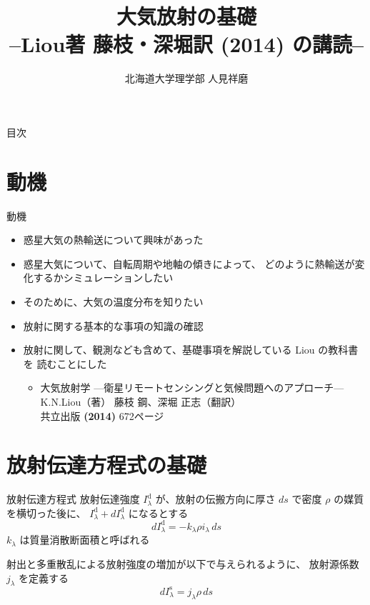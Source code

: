\documentclass[unicode,colorlinks]{beamer}
\title{大気放射の基礎\\--Liou著 藤枝・深堀訳 (2014) の講読--}
\author{北海道大学理学部 人見祥磨}
\date{\warekitoday}
\begin{document}
\maketitle
\mleftright

\begin{frame}{目次}
	\tableofcontents
\end{frame}

\section{動機}

\begin{frame}{動機}
	\begin{itemize}
		\item 惑星大気の熱輸送について興味があった
		\item 惑星大気について、自転周期や地軸の傾きによって、
			どのように熱輸送が変化するかシミュレーションしたい
		\item そのために、大気の温度分布を知りたい
		\item 放射に関する基本的な事項の知識の確認
		\item 放射に関して、観測なども含めて、基礎事項を解説している Liou の教科書を
			読むことにした
			\begin{itemize}
				\item 大気放射学 {\scriptsize---衛星リモートセンシングと気候問題へのアプローチ---}\\
					K.N.Liou（著） 藤枝 鋼、深堀 正志（翻訳）\\
					共立出版 \textbf{(2014)} 672ページ
			\end{itemize}
	\end{itemize}
\end{frame}

\section{放射伝達方程式の基礎}

\begin{frame}{放射伝達方程式}
	放射伝達強度 $I_\lambda^\mathrm{d}$ が、放射の伝搬方向に厚さ $ds$ で密度 $\rho$ の媒質を横切った後に、
	$I_\lambda^\mathrm{d}+dI_\lambda^\mathrm{d}$ になるとする
	\[dI_\lambda^\mathrm{d}=-k_\lambda\rho i_\lambda\,ds\]
	$k_\lambda$ は質量消散断面積と呼ばれる

	射出と多重散乱による放射強度の増加が以下で与えられるように、
	放射源係数 $j_\lambda$ を定義する
	\[dI_\lambda^\mathrm{s}=j_\lambda\rho\,ds\]
\end{frame}
\end{document}
